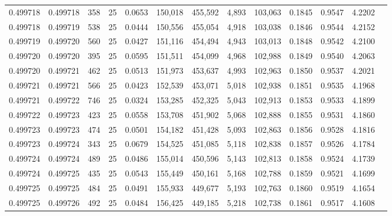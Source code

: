 \begin{tabular}{rrrrrrrrrrrrr}
0.499718 & 0.499718 &   358 &  25 &                                     0.0653 & 150,018 & 455,592 &   4,893 & 103,063 & 0.1845 & 0.9547 & 4.2202 \\
0.499718 & 0.499719 &   538 &  25 &                                     0.0444 & 150,556 & 455,054 &   4,918 & 103,038 & 0.1846 & 0.9544 & 4.2152 \\
0.499719 & 0.499720 &   560 &  25 &                                     0.0427 & 151,116 & 454,494 &   4,943 & 103,013 & 0.1848 & 0.9542 & 4.2100 \\
0.499720 & 0.499720 &   395 &  25 &                                     0.0595 & 151,511 & 454,099 &   4,968 & 102,988 & 0.1849 & 0.9540 & 4.2063 \\
0.499720 & 0.499721 &   462 &  25 &                                     0.0513 & 151,973 & 453,637 &   4,993 & 102,963 & 0.1850 & 0.9537 & 4.2021 \\
0.499721 & 0.499721 &   566 &  25 &                                     0.0423 & 152,539 & 453,071 &   5,018 & 102,938 & 0.1851 & 0.9535 & 4.1968 \\
0.499721 & 0.499722 &   746 &  25 &                                     0.0324 & 153,285 & 452,325 &   5,043 & 102,913 & 0.1853 & 0.9533 & 4.1899 \\
0.499722 & 0.499723 &   423 &  25 &                                     0.0558 & 153,708 & 451,902 &   5,068 & 102,888 & 0.1855 & 0.9531 & 4.1860 \\
0.499723 & 0.499723 &   474 &  25 &                                     0.0501 & 154,182 & 451,428 &   5,093 & 102,863 & 0.1856 & 0.9528 & 4.1816 \\
0.499723 & 0.499724 &   343 &  25 &                                     0.0679 & 154,525 & 451,085 &   5,118 & 102,838 & 0.1857 & 0.9526 & 4.1784 \\
0.499724 & 0.499724 &   489 &  25 &                                     0.0486 & 155,014 & 450,596 &   5,143 & 102,813 & 0.1858 & 0.9524 & 4.1739 \\
0.499724 & 0.499725 &   435 &  25 &                                     0.0543 & 155,449 & 450,161 &   5,168 & 102,788 & 0.1859 & 0.9521 & 4.1699 \\
0.499725 & 0.499725 &   484 &  25 &                                     0.0491 & 155,933 & 449,677 &   5,193 & 102,763 & 0.1860 & 0.9519 & 4.1654 \\
0.499725 & 0.499726 &   492 &  25 &                                     0.0484 & 156,425 & 449,185 &   5,218 & 102,738 & 0.1861 & 0.9517 & 4.1608 \\

\end{tabular}
